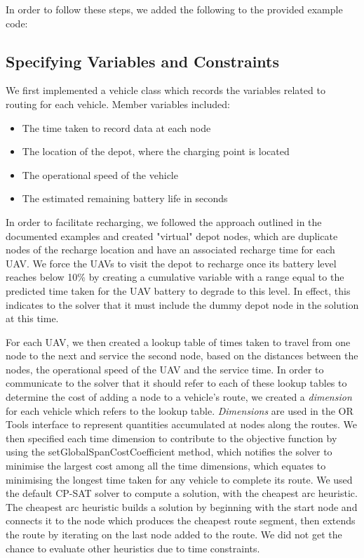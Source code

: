 In order to follow these steps, we added the following to the provided example code:

\subsection{Specifying Variables and Constraints}
We first implemented a vehicle class which records the variables related to routing for each vehicle. Member variables included:
\begin{itemize}
    \item The time taken to record data at each node
    \item The location of the depot, where the charging point is located
    \item The operational speed of the vehicle
    \item The estimated remaining battery life in seconds
\end{itemize}
In order to facilitate recharging, we followed the approach outlined in the documented examples and created "virtual" depot nodes, which are duplicate nodes of the recharge location and have an associated recharge time for each UAV.  We force the UAVs to visit the depot to recharge once its battery level reaches below 10\% by creating a cumulative variable with a range equal to the predicted time taken for the UAV battery to degrade to this level. In effect, this indicates to the solver that it must include the dummy depot node in the solution at this time.

For each UAV, we then created a lookup table of times taken to travel from one node to the next and service the second node, based on the distances between the nodes, the operational speed of the UAV and the service time. In order to communicate to the solver that it should refer to each of these lookup tables to determine the cost of adding a node to a vehicle's route, we created a \textit{dimension} for each vehicle which refers to the lookup table. \textit{Dimensions} are used in the OR Tools interface to represent quantities accumulated at nodes along the routes. We then specified each time dimension to contribute to the objective function by using the setGlobalSpanCostCoefficient method, which notifies the solver to minimise the largest cost among all the time dimensions, which equates to minimising the longest time taken for any vehicle to complete its route. We used the default CP-SAT solver to compute a solution, with the cheapest arc heuristic. The cheapest arc heuristic builds a solution by beginning with the start node and connects it to the node which produces the cheapest route segment, then extends the route by iterating on the last node added to the route. We did not get the chance to evaluate other heuristics due to time constraints.

